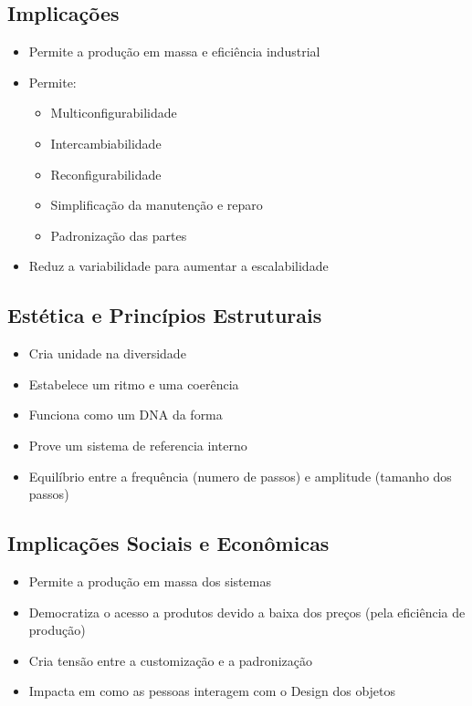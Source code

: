 \documentclass{article}
\begin{document}
\subsection{Implicações}
\begin{itemize}
    \item Permite a produção em massa e eficiência industrial
    \item Permite:
    \begin{itemize}
        \item Multiconfigurabilidade
        \item Intercambiabilidade
        \item Reconfigurabilidade
        \item Simplificação da manutenção e reparo
        \item Padronização das partes
    \end{itemize}
    \item Reduz a variabilidade para aumentar a escalabilidade
\end{itemize}
\subsection{Estética e Princípios Estruturais}
\begin{itemize}
    \item Cria unidade na diversidade
    \item Estabelece um ritmo e uma coerência
    \item Funciona como um DNA da forma
    \item Prove um sistema de referencia interno
    \item Equilíbrio entre a frequência (numero de passos) e amplitude (tamanho dos passos)
\end{itemize}
\subsection{Implicações Sociais e Econômicas}
\begin{itemize}
    \item Permite a produção em massa dos sistemas
    \item Democratiza o acesso a produtos devido a baixa dos preços (pela eficiência de produção)
    \item Cria tensão entre a customização e a padronização
    \item Impacta em como as pessoas interagem com o Design dos objetos
\end{itemize}
\end{document}
